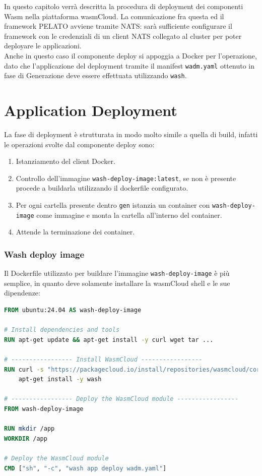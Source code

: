 In questo capitolo verrà descritta la procedura di deployment dei componenti Wasm nella piattaforma wasmCloud. La comunicazione fra questa ed il framework PELATO avviene tramite NATS: sarà sufficiente configurare il framework con le credenziali di un client NATS collegato al cluster per poter deployare le applicazioni.\\
Anche in questo caso il componente deploy si appoggia a Docker per l'operazione, dato che l'applicazione del deployment tramite il manifest \texttt{wadm.yaml} ottenuto in fase di Generazione deve essere effettuata utilizzando \texttt{wash}.

\section{Application Deployment}

La fase di deployment è strutturata in modo molto simile a quella di build, infatti le operazioni svolte dal componente deploy sono:

\begin{enumerate}
    \item Istanziamento del client Docker.
    \item Controllo dell'immagine \texttt{wash-deploy-image:latest}, se non è presente procede a buildarla utilizzando il dockerfile configurato.
    \item Per ogni cartella presente dentro \texttt{gen} istanzia un container con \texttt{wash-deploy-image} come immagine e monta la cartella all'interno del container.
    \item Attende la terminazione dei container.
\end{enumerate}

\subsubsection{Wash deploy image}

 Il Dockerfile utilizzato per buildare l'immagine \texttt{wash-deploy-image} è più semplice, in quanto deve solamente installare la wasmCloud shell e le sue dipendenze:
 
\begin{lstlisting}[language=Dockerfile, caption={wash-build-image Dockerfile}, captionpos=b, label={code:wash_buil_image_dockerfile}, basicstyle=\ttfamily\small]
FROM ubuntu:24.04 AS wash-deploy-image

# Install dependencies and tools
RUN apt-get update && apt-get install -y curl wget tar ...

# ----------------- Install WasmCloud -----------------
RUN curl -s "https://packagecloud.io/install/repositories/wasmcloud/core/script.deb.sh" | bash && \
    apt-get install -y wash

# ----------------- Deploy the WasmCloud module -----------------
FROM wash-deploy-image

RUN mkdir /app
WORKDIR /app

# Deploy the WasmCloud module
CMD ["sh", "-c", "wash app deploy wadm.yaml"]
\end{lstlisting}

